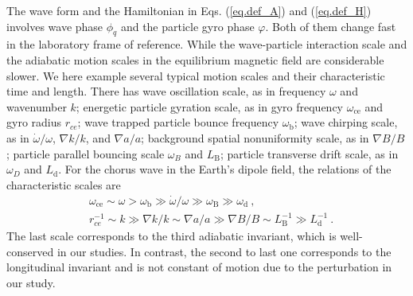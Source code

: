 The wave form and the Hamiltonian in Eqs. (\ref{eq.def_A}) and (\ref{eq.def_H}) involves wave phase $\phi_q$ and the particle gyro phase $\varphi$. Both of them change fast in the laboratory frame of reference. While the wave-particle interaction scale and the adiabatic motion scales in the equilibrium magnetic field are considerable slower. 
We here example several typical motion scales and their characteristic time and length. 
There has wave oscillation scale, as in frequency $\omega$ and wavenumber $k$;
energetic particle gyration scale, as in gyro frequency $\omega_\mathrm{ce}$ and gyro radius $r_{ce}$;
wave trapped particle bounce frequency $\omega_\mathrm{b}$; wave chirping scale, as in $\dot{\omega}/\omega$, $\nabla k/k$, and $\nabla a/a$; background spatial nonuniformity scale, as in $\nabla B/B$; particle parallel bouncing scale $\omega_B$ and $L_\mathrm{B}$; particle transverse drift scale, as in $\omega_D$ and $L_\mathrm{d}$. 
For the chorus wave in the Earth's dipole field, the relations of the characteristic scales are
\begin{equation}
    \begin{aligned}
        &\omega_\mathrm{ce} \sim \omega >  \omega_\mathrm{b} \gg \dot\omega/\omega  \gg \omega_\mathrm{B} \gg \omega_\mathrm{d}~,
        \\
        &r^{-1}_{ce} \sim k \gg \nabla k/k\sim \nabla a/a \gg \nabla B/B \sim L_\mathrm{B}^{-1} \gg L_\mathrm{d}^{-1}~.
    \end{aligned}
\end{equation}
The last scale corresponds to the third adiabatic invariant, which is well-conserved in our studies. 
In contrast, the second to last one corresponds to the longitudinal invariant and is not constant of motion due to the perturbation in our study.  


